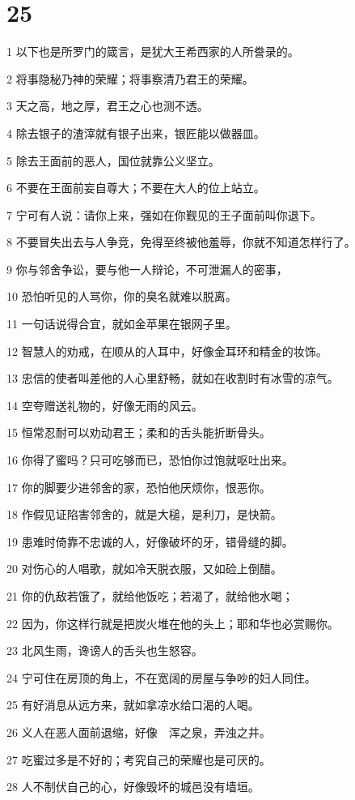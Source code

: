 \chapter{25}

\par 1 以下也是所罗门的箴言，是犹大王希西家的人所誊录的。
\par 2 将事隐秘乃神的荣耀；将事察清乃君王的荣耀。
\par 3 天之高，地之厚，君王之心也测不透。
\par 4 除去银子的渣滓就有银子出来，银匠能以做器皿。
\par 5 除去王面前的恶人，国位就靠公义坚立。
\par 6 不要在王面前妄自尊大；不要在大人的位上站立。
\par 7 宁可有人说：请你上来，强如在你觐见的王子面前叫你退下。
\par 8 不要冒失出去与人争竞，免得至终被他羞辱，你就不知道怎样行了。
\par 9 你与邻舍争讼，要与他一人辩论，不可泄漏人的密事，
\par 10 恐怕听见的人骂你，你的臭名就难以脱离。
\par 11 一句话说得合宜，就如金苹果在银网子里。
\par 12 智慧人的劝戒，在顺从的人耳中，好像金耳环和精金的妆饰。
\par 13 忠信的使者叫差他的人心里舒畅，就如在收割时有冰雪的凉气。
\par 14 空夸赠送礼物的，好像无雨的风云。
\par 15 恒常忍耐可以劝动君王；柔和的舌头能折断骨头。
\par 16 你得了蜜吗？只可吃够而已，恐怕你过饱就呕吐出来。
\par 17 你的脚要少进邻舍的家，恐怕他厌烦你，恨恶你。
\par 18 作假见证陷害邻舍的，就是大槌，是利刀，是快箭。
\par 19 患难时倚靠不忠诚的人，好像破坏的牙，错骨缝的脚。
\par 20 对伤心的人唱歌，就如冷天脱衣服，又如硷上倒醋。
\par 21 你的仇敌若饿了，就给他饭吃；若渴了，就给他水喝；
\par 22 因为，你这样行就是把炭火堆在他的头上；耶和华也必赏赐你。
\par 23 北风生雨，谗谤人的舌头也生怒容。
\par 24 宁可住在房顶的角上，不在宽阔的房屋与争吵的妇人同住。
\par 25 有好消息从远方来，就如拿凉水给口渴的人喝。
\par 26 义人在恶人面前退缩，好像　浑之泉，弄浊之井。
\par 27 吃蜜过多是不好的；考究自己的荣耀也是可厌的。
\par 28 人不制伏自己的心，好像毁坏的城邑没有墙垣。

